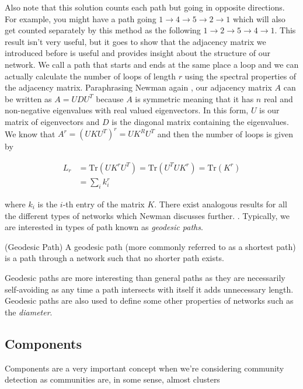Also note that this solution counts each path but going in opposite directions. For example, you might have a path going $1 \rightarrow 4 \rightarrow 5 \rightarrow 2 \rightarrow 1$ which will also get counted separately by this method as the following $1 \rightarrow 2 \rightarrow 5 \rightarrow 4 \rightarrow 1$. This result isn't very useful, but it goes to show that the adjacency matrix we introduced before is useful and provides insight about the structure of our network. We call a path that starts and ends at the same place a loop and we can actually calculate the number of loops of length $r$ using the spectral properties of the adjacency matrix. Paraphrasing Newman again \cite[137]{newman10}, our adjacency matrix $A$ can be written as $A = UDU^T$ because $A$ is symmetric meaning that it has $n$ real and non-negative eigenvalues with real valued eigenvectors. In this form, $U$ is our matrix of eigenvectors and $D$ is the diagonal matrix containing the eigenvalues. We know that $A^r = (UKU^T)^r = UK^RU^T$ and then the number of loops is given by

$$
\begin{aligned}
    L_r &= \text{Tr}(UK^rU^T) = \text{Tr}(U^TUK^r) = \text{Tr}(K^r) \\
    & = \sum_i k_i^r
\end{aligned}
$$

where $k_i$ is the $i$-th entry of the matrix $K$. There exist analogous results for all the different types of networks which Newman discusses further. \cite[138]{newman10}. Typically, we are interested in types of path known as \emph{geodesic paths}.

\begin{definition}{(Geodesic Path)}
    A geodesic path (more commonly referred to as a shortest path) is a path through a network such that no shorter path exists.
\end{definition}

Geodesic paths are more interesting than general paths as they are necessarily self-avoiding as any time a path intersects with itself it adds unnecessary length. Geodesic paths are also used to define some other properties of networks such as the \emph{diameter}.

\subsection{Components}
Components are a very important concept when we're considering community detection as communities are, in some sense, almost clusters

